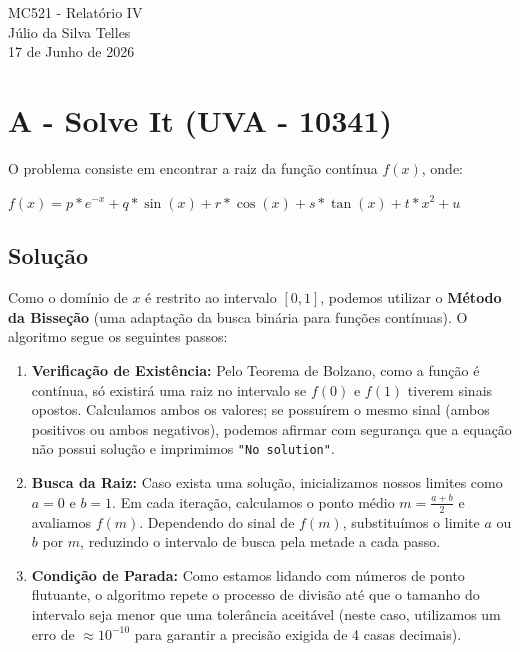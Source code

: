 \documentclass[12pt,a4paper]{article}
\begin{document}
\begin{center}
    {\LARGE MC521 - Relatório IV} \\ [2,5em]
    {\large Júlio da Silva Telles} \\ [1,0em]
    {\large 17 de Junho de 2026} \\ [1,5em]
\end{center}

\vspace{1cm} 

\section{A - Solve It (UVA - 10341)}

O problema consiste em encontrar a raiz da função contínua $f(x)$, onde:
\begin{center}
$f(x) = p * e^{-x} + q * \sin(x) + r * \cos(x) + s * \tan(x) + t * x^2 + u$
\end{center}

\subsection{Solução}

Como o domínio de $x$ é restrito ao intervalo $[0, 1]$, podemos utilizar o \textbf{Método da Bisseção} (uma adaptação da busca binária para funções contínuas). O algoritmo segue os seguintes passos:

\begin{enumerate}
    \item \textbf{Verificação de Existência:} Pelo Teorema de Bolzano, como a função é contínua, só existirá uma raiz no intervalo se $f(0)$ e $f(1)$ tiverem sinais opostos. Calculamos ambos os valores; se possuírem o mesmo sinal (ambos positivos ou ambos negativos), podemos afirmar com segurança que a equação não possui solução e imprimimos \texttt{"No solution"}.
    
    \item \textbf{Busca da Raiz:} Caso exista uma solução, inicializamos nossos limites como $a = 0$ e $b = 1$. Em cada iteração, calculamos o ponto médio $m = \frac{a + b}{2}$ e avaliamos $f(m)$. Dependendo do sinal de $f(m)$, substituímos o limite $a$ ou $b$ por $m$, reduzindo o intervalo de busca pela metade a cada passo.
    
    \item \textbf{Condição de Parada:} Como estamos lidando com números de ponto flutuante, o algoritmo repete o processo de divisão até que o tamanho do intervalo seja menor que uma tolerância aceitável (neste caso, utilizamos um erro de $\approx 10^{-10}$ para garantir a precisão exigida de 4 casas decimais).
\end{enumerate}
\end{document}
